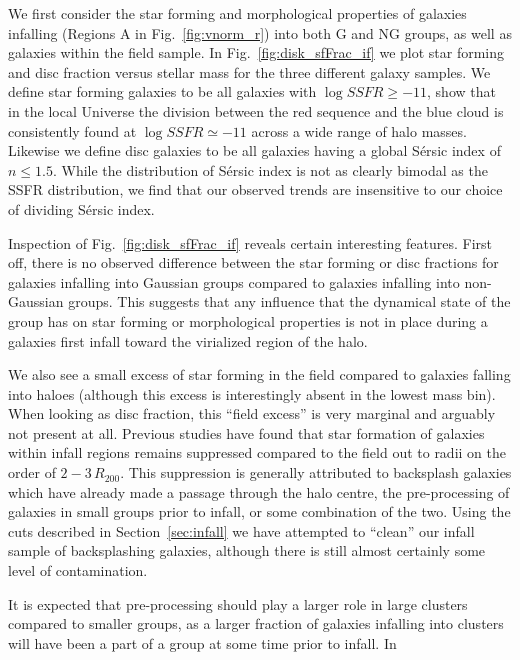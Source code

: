 \documentclass[a4paper,fleqn,usenatbib]{mnras}
\begin{document}
We first consider the star forming and morphological properties of
galaxies infalling (Regions A in Fig.~\ref{fig:vnorm_r}) into both G
and NG groups, as well as galaxies within the field sample.  In
Fig.~\ref{fig:disk_sfFrac_if} we plot star forming and disc fraction
versus stellar mass for the three different galaxy samples.  We define
star forming galaxies to be all galaxies with $\log SSFR \ge -11$,
\citet{wetzel2012} show that in the local Universe the division
between the red sequence and the blue cloud is consistently found at
$\log SSFR \simeq -11$ across a wide range of halo masses.  Likewise
we define disc galaxies to be all galaxies having a global S\'{e}rsic
index of $n \le 1.5$.  While the distribution of S\'{e}rsic index is
not as clearly bimodal as the SSFR distribution, we find that our
observed trends are insensitive to our choice of dividing S\'{e}rsic
index.
\par
Inspection of Fig.~\ref{fig:disk_sfFrac_if} reveals certain
interesting features.  First off, there is no observed difference
between the star forming or disc fractions for galaxies infalling into
Gaussian groups compared to galaxies infalling into non-Gaussian
groups.  This suggests that any influence that the dynamical state
of the group
has on star forming or morphological properties is not in place during
a galaxies first infall toward the virialized region of the halo.
\par
We also see a small excess of star forming in the field compared to
galaxies falling into haloes (although this excess is interestingly
absent in the lowest mass bin).  When looking as disc fraction, this
``field excess'' is very marginal and arguably not present at all.
Previous studies \citep{lewis2002, gray2004, rines2005, verdugo2008}
have found that star formation of galaxies within infall regions
remains suppressed compared to the field out to radii on the order of
$2-3\,R_{200}$.  This suppression is generally attributed to
backsplash galaxies which have already made a passage through the halo
centre, the pre-processing of galaxies in small groups prior to
infall, or some combination of the two.  Using the cuts described in
Section~\ref{sec:infall} we have attempted to ``clean'' our infall sample
of backsplashing galaxies, although there is still almost certainly
some level of contamination.
\par
It is expected that pre-processing
should play a larger role in large clusters compared to smaller
groups, as a larger fraction of galaxies infalling into clusters will
have been a part of a group at some time prior to infall.  In
\end{document}
